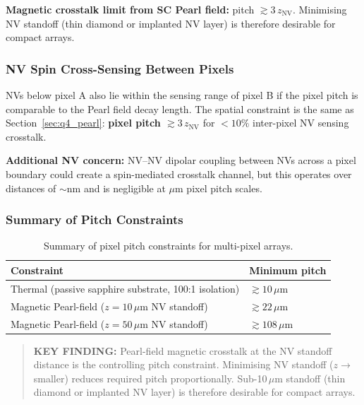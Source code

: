 \textbf{Magnetic crosstalk limit from SC Pearl field:} pitch $\gtrsim 3\,z_\mathrm{NV}$.
Minimising NV standoff (thin diamond or implanted NV layer) is therefore desirable
for compact arrays.

\subsubsection{NV Spin Cross-Sensing Between Pixels}
\label{sec:q4_nv}

NVs below pixel A also lie within the sensing range of pixel B if the pixel pitch
is comparable to the Pearl field decay length. The spatial constraint is the same
as Section~\ref{sec:q4_pearl}: \textbf{pixel pitch $\gtrsim 3\,z_\mathrm{NV}$}
for $<10\%$ inter-pixel NV sensing crosstalk.

\textbf{Additional NV concern:} NV--NV dipolar coupling between NVs across a pixel
boundary could create a spin-mediated crosstalk channel, but this operates over
distances of $\sim\!\mathrm{nm}$ and is negligible at $\mu$m pixel pitch
scales.~\cite{Doherty2013} %

\subsubsection{Summary of Pitch Constraints}
\label{sec:q4_summary}

\begin{table}[ht]
\centering
\caption{Summary of pixel pitch constraints for multi-pixel arrays.}
\label{tab:q4_pitch_summary}
\small
\begin{tabular}{@{}ll@{}}
\toprule
Constraint & Minimum pitch \\
\midrule
Thermal (passive sapphire substrate, 100:1 isolation) & $\gtrsim 10\,\mu$m \\
Magnetic Pearl-field ($z = 10\,\mu$m NV standoff) & $\gtrsim 22\,\mu$m \\
Magnetic Pearl-field ($z = 50\,\mu$m NV standoff) & $\gtrsim 108\,\mu$m \\
\bottomrule
\end{tabular}
\end{table}

\begin{quote}
\textbf{KEY FINDING:}
Pearl-field magnetic crosstalk at the NV standoff distance is the controlling
pitch constraint. Minimising NV standoff ($z \to$ smaller) reduces required pitch
proportionally. Sub-10\,$\mu$m standoff (thin diamond or implanted NV layer)
is therefore desirable for compact arrays.
\end{quote}

